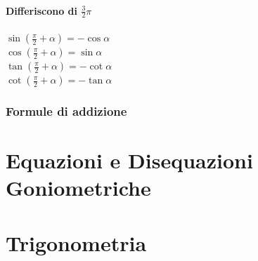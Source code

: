 \documentclass{report}
\begin{document}
\subsubsection{Differiscono di $\frac{3}{2}\pi$} %
\label{sec:Differiscono di $\frac{3}{2}\pi$}
$\sin(\frac{\pi}{2}+\alpha) = -\cos\alpha$ 
\\
$\cos(\frac{\pi}{2}+\alpha) = \sin\alpha$ 
\\ 
$\tan(\frac{\pi}{2}+\alpha) = -\cot\alpha$ 
\\
$\cot(\frac{\pi}{2}+\alpha) = -\tan\alpha$ 


\subsection{Formule di addizione} %
\label{sub:Formule di addizione}



\chapter{Equazioni e Disequazioni Goniometriche} %
\label{chap:Equazioni e Disequazioni Goniometriche}


\chapter{Trigonometria} %
\label{chap:Trigonometria}

\end{document}
